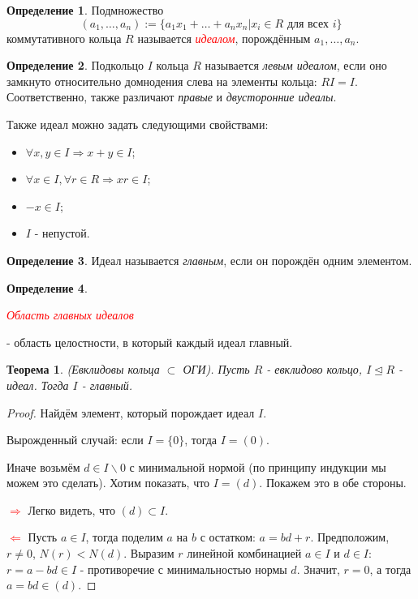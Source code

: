 \documentclass[a4paper,100pt]{article}
\theoremstyle{indented}
\newtheorem{theorem}{Теорема}
\theoremstyle{definition}
\newtheorem{defn}{Определение}
\theoremstyle{remark}
\begin{document}
\begin{defn}
    Подмножество 
    \[
        (a_1, \dots, a_n):=\{a_1x_1+\dots+a_nx_n\vert x_i\in R \text{ для всех } i\}
    \]
    коммутативного кольца $R$ называется \hypertarget{n9}{\textcolor{red}{\textit{идеалом}}}, порождённым $a_1, \dots, a_n$.
\end{defn}

\begin{defn}
    Подкольцо $I$ кольца $R$ называется \textit{левым идеалом}, если оно замкнуто относительно домнодения слева на элементы кольца: $RI=I$. Соответственно, также различают \textit{правые} и \textit{двусторонние идеалы}. 
\end{defn}

Также идеал можно задать следующими свойствами:
\begin{itemize}
    \item $\forall x, y\in I \Longrightarrow x+y\in I$;
    \item $\forall x\in I, \forall r\in R \Longrightarrow xr\in I$;
    \item $-x\in I$;
    \item $I$ - непустой.
\end{itemize}

\begin{defn}
    Идеал называется \textit{главным}, если он порождён одним элементом.
\end{defn}

\begin{defn}
    \hypertarget{n10}{\textcolor{red}{\textit{Область главных идеалов}}} - область целостности, в который каждый идеал главный.
\end{defn}

\begin{theorem}
    (Евклидовы кольца $\subset$ ОГИ). Пусть $R$ - евклидово кольцо, $I\unlhd R$ - идеал. Тогда $I$ - главный.
\end{theorem}

\begin{proof}
    Найдём элемент, который порождает идеал $I$.\
        
    Вырожденный случай: если $I=\{0\}$, тогда $I=(0)$.\

    Иначе возьмём $d\in I\backslash 0$ с минимальной нормой (по принципу индукции мы можем это сделать). Хотим показать, что $I=(d)$. Покажем это в обе стороны.\

    \textcolor{red}{$\Rightarrow$} Легко видеть, что $(d) \subset I$.\

    \textcolor{red}{$\Leftarrow$} Пусть $a \in I$, тогда поделим $a$ на $b$ с остатком: $a=bd+r$. Предположим, $r\neq 0$, $N(r)<N(d)$. Выразим $r$ линейной комбинацией $a\in I$ и $d \in I$: $r=a-bd\in I$ - противоречие с минимальностью нормы $d$. Значит, $r=0$, а тогда $a=bd\in (d)$.
\end{proof}
\end{document}
